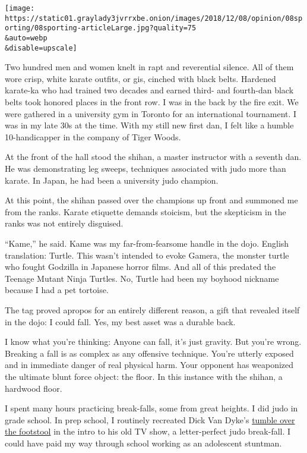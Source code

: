 \texttt{[image: https://static01.graylady3jvrrxbe.onion/images/2018/12/08/opinion/08sporting/08sporting-articleLarge.jpg?quality=75\\\&auto=webp\\\&disable=upscale]}

Two hundred men and women knelt in rapt and reverential silence. All of
them wore crisp, white karate outfits, or gis, cinched with black belts.
Hardened karate-ka who had trained two decades and earned third- and
fourth-dan black belts took honored places in the front row. I was in
the back by the fire exit. We were gathered in a university gym in
Toronto for an international tournament. I was in my late 30s at the
time. With my still new first dan, I felt like a humble 10-handicapper
in the company of Tiger Woods.

At the front of the hall stood the shihan, a master instructor with a
seventh dan. He was demonstrating leg sweeps, techniques associated with
judo more than karate. In Japan, he had been a university judo champion.

At this point, the shihan passed over the champions up front and
summoned me from the ranks. Karate etiquette demands stoicism, but the
skepticism in the ranks was not entirely disguised.

``Kame,'' he said. Kame was my far-from-fearsome handle in the dojo.
English translation: Turtle. This wasn't intended to evoke Gamera, the
monster turtle who fought Godzilla in Japanese horror films. And all of
this predated the Teenage Mutant Ninja Turtles. No, Turtle had been my
boyhood nickname because I had a pet tortoise.

The tag proved apropos for an entirely different reason, a gift that
revealed itself in the dojo: I could fall. Yes, my best asset was a
durable back.

I know what you're thinking: Anyone can fall, it's just gravity. But
you're wrong. Breaking a fall is as complex as any offensive technique.
You're utterly exposed and in immediate danger of real physical harm.
Your opponent has weaponized the ultimate blunt force object: the floor.
In this instance with the shihan, a hardwood floor.

I spent many hours practicing break-falls, some from great heights. I
did judo in grade school. In prep school, I routinely recreated Dick Van
Dyke's \href{https://www.youtube.com/watch?v=BttXQJ_gDnc}{tumble over
the footstool} in the intro to his old TV show, a letter-perfect judo
break-fall. I could have paid my way through school working as an
adolescent stuntman.

